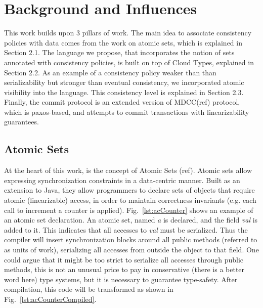 

\section{Background and Influences}
This work builds upon 3 pillars of work. The main idea to associate consistency
policies with data comes from the work on atomic sets, which is explained in
Section 2.1. The language we propose, that incorporates the notion of sets
annotated with consistency policies, is built on top of Cloud Types, explained
in Section 2.2. As an example of a consistency policy weaker than than
serializability but stronger than eventual consistency, we incorporated atomic
visibility into the language. This consistency level is explained in Section
2.3. Finally, the commit protocol is an extended version of MDCC(ref) protocol,
which is paxos-based, and attempts to commit transactions with linearizability
guarantees.



\subsection{Atomic Sets}
At the heart of this work, is the concept of Atomic Sets (ref). Atomic sets allow 
expressing synchronization constraints in a
data-centric manner. Built as an extension to Java, they allow programmers to
declare sets of objects that require atomic (linearizable) access, in order to
maintain correctness invariants (e.g. each call to increment a counter is
applied). Fig.~\ref{lst:acCounter} shows an example of an atomic set
declaration. An atomic set, named \emph{a} is declared, and the field \emph{val}
is added to it. This indicates that all accesses to \emph{val} must be
serialized. Thus the compiler will insert synchronization blocks around all
public methods (referred to as units of work), serializing all accesses from
outside the object to that field. One could argue that it might be too strict to
serialize all accesses through public methods, this is not an unusual price to
pay in conservative (there is a better word here) type systems, but it is
necessary to guarantee type-safety. After compilation, this code will be
transformed as shown in Fig.~\ref{lst:acCounterCompiled}. \\

